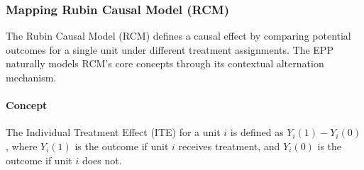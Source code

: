 
\subsubsection{Mapping Rubin Causal Model (RCM)}
\label{subsec:formalization_mapping_rcm}

The Rubin Causal Model (RCM) defines a causal effect by comparing potential outcomes for a single unit under different treatment assignments. The EPP naturally models RCM's core concepts through its contextual alternation mechanism.

\paragraph{Concept}
The Individual Treatment Effect (ITE) for a unit \(i\) is defined as \(Y_i(1) - Y_i(0)\), where \(Y_i(1)\) is the outcome if unit \(i\) receives treatment, and \(Y_i(0)\) is the outcome if unit \(i\) does not.

